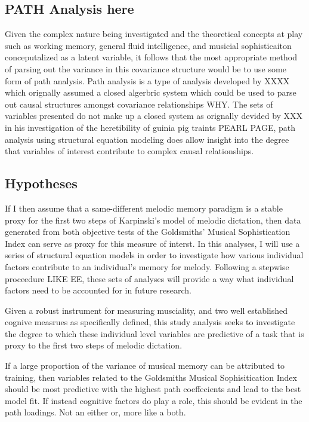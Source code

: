\documentclass[]{book}
\begin{document}
\hypertarget{path-analysis-here}{%
\subsection{PATH Analysis here}\label{path-analysis-here}}

Given the complex nature being investigated and the theoretical concepts at play such as working memory, general fluid intelligence, and musicial sophisticaiton conceputalized as a latent variable, it follows that the most appropriate method of parsing out the variance in this covariance structure would be to use some form of path analysis.
Path analysis is a type of analysis developed by XXXX which orignally assumed a closed algerbric system which could be used to parse out causal structures amongst covariance relationships WHY.
The sets of variables presented do not make up a closed system as orignally devided by XXX in his investigation of the heretibility of guinia pig traints PEARL PAGE, path analysis using structural equation modeling does allow insight into the degree that variables of interest contribute to complex causal relationships.

\hypertarget{hypotheses}{%
\subsection{Hypotheses}\label{hypotheses}}

If I then assume that a same-different melodic memory paradigm is a stable proxy for the first two steps of Karpinski's model of melodic dictation, then data generated from both objective tests of the Goldsmiths' Musical Sophistication Index can serve as proxy for this measure of interst.
In this analyses, I will use a series of structural equation models in order to investigate how various individual factors contribute to an individual's memory for melody.
Following a stepwise proceedure LIKE EE, these sets of analyses will provide a way what individual factors need to be accounted for in future research.

Given a robust instrument for measuring musciality, and two well established cognive measrues as specifically defined, this study analysis seeks to investigate the degree to which these individual level variables are predictive of a task that is proxy to the first two steps of melodic dictation.

If a large proportion of the variance of musical memory can be attributed to training, then variables related to the Goldsmiths Musical Sophisitication Index should be most predictive with the highest path coeffecients and lead to the best model fit.
If instead cognitive factors do play a role, this should be evident in the path loadings.
Not an either or, more like a both.
\end{document}
